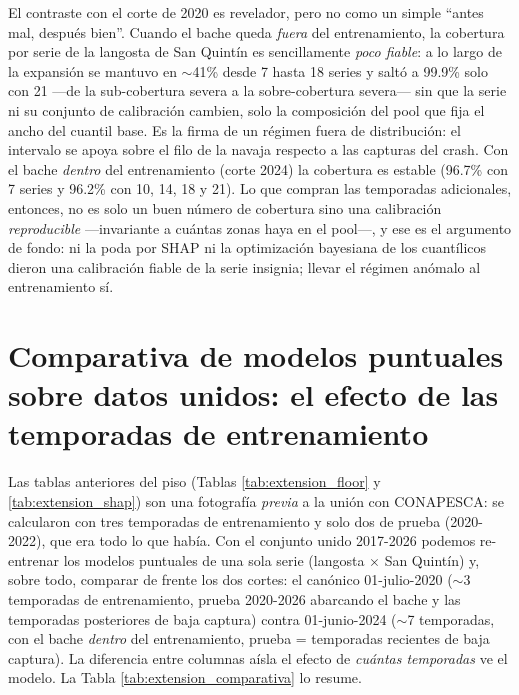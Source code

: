 El contraste con el corte de 2020 es revelador, pero no como un simple ``antes mal, después bien''. Cuando el bache queda \emph{fuera} del entrenamiento, la cobertura por serie de la langosta de San Quintín es sencillamente \emph{poco fiable}: a lo largo de la expansión se mantuvo en $\sim$41\% desde 7 hasta 18 series y saltó a 99.9\% solo con 21 ---de la sub-cobertura severa a la sobre-cobertura severa--- sin que la serie ni su conjunto de calibración cambien, solo la composición del pool que fija el ancho del cuantil base. Es la firma de un régimen fuera de distribución: el intervalo se apoya sobre el filo de la navaja respecto a las capturas del crash. Con el bache \emph{dentro} del entrenamiento (corte 2024) la cobertura es estable (96.7\% con 7 series y 96.2\% con 10, 14, 18 y 21). Lo que compran las temporadas adicionales, entonces, no es solo un buen número de cobertura sino una calibración \emph{reproducible} ---invariante a cuántas zonas haya en el pool---, y ese es el argumento de fondo: ni la poda por SHAP ni la optimización bayesiana de los cuantílicos dieron una calibración fiable de la serie insignia; llevar el régimen anómalo al entrenamiento sí.

\section{Comparativa de modelos puntuales sobre datos unidos: el efecto de las temporadas de entrenamiento}
\label{sec:res_comparativa}
Las tablas anteriores del piso (Tablas \ref{tab:extension_floor} y \ref{tab:extension_shap}) son una fotografía \emph{previa} a la unión con CONAPESCA: se calcularon con tres temporadas de entrenamiento y solo dos de prueba (2020-2022), que era todo lo que había. Con el conjunto unido 2017-2026 podemos re-entrenar los modelos puntuales de una sola serie (langosta $\times$ San Quintín) y, sobre todo, comparar de frente los dos cortes: el canónico 01-julio-2020 ($\sim$3 temporadas de entrenamiento, prueba 2020-2026 abarcando el bache y las temporadas posteriores de baja captura) contra 01-junio-2024 ($\sim$7 temporadas, con el bache \emph{dentro} del entrenamiento, prueba = temporadas recientes de baja captura). La diferencia entre columnas aísla el efecto de \emph{cuántas temporadas} ve el modelo. La Tabla \ref{tab:extension_comparativa} lo resume.

